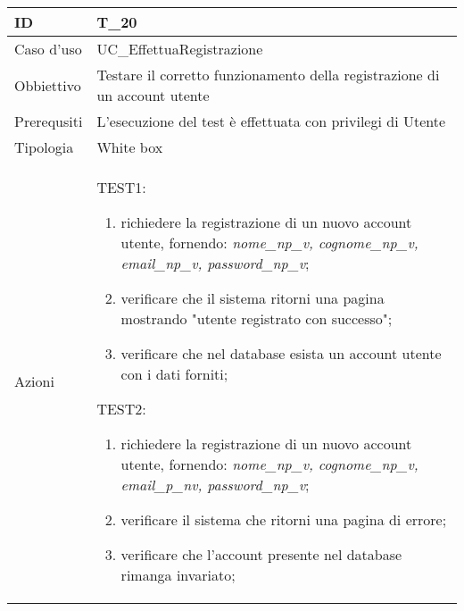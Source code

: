 \begin{table}[hb]
    \centering
    \begin{tabular}{ |p{2cm}|p{10cm}|  }
        \hline
        ID          & T\_20                                                                      \\\hline
        Caso d'uso  & UC\_EffettuaRegistrazione                                                  \\\hline
        Obbiettivo  & Testare il corretto funzionamento della registrazione di un account utente \\\hline
        Prerequsiti & L'esecuzione del test è effettuata con privilegi di Utente                 \\\hline
        Tipologia   & White box                                                                  \\\hline
        Azioni      &
        TEST1:
        \begin{enumerate}[nosep, topsep=0pt]
            \item richiedere la registrazione di un nuovo account utente, fornendo: \emph{nome\_np\_v, cognome\_np\_v, email\_np\_v, password\_np\_v};
            \item verificare che il sistema ritorni una pagina mostrando "utente registrato con successo";
            \item verificare che nel database esista un account utente con i dati forniti;
        \end{enumerate}
        \vspace{0.5cm} TEST2:
        \begin{enumerate}[nosep, topsep=0pt]
            \item richiedere la registrazione di un nuovo account utente, fornendo: \emph{nome\_np\_v, cognome\_np\_v, email\_p\_nv, password\_np\_v};
            \item verificare il sistema che ritorni una pagina di errore;
            \item verificare che l'account presente nel database rimanga invariato; 
        \end{enumerate}
        \\\hline
    \end{tabular}
\end{table}

